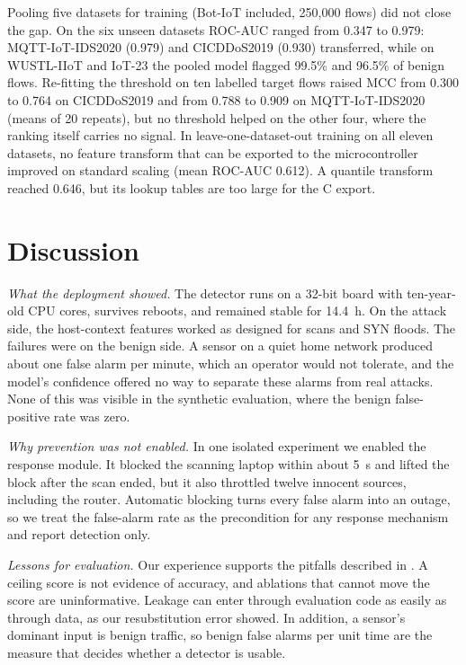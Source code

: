 \documentclass[conference]{IEEEtran}
\begin{document}
Pooling five datasets for training (Bot-IoT included, 250{,}000 flows) did
not close the gap. On the six unseen datasets ROC-AUC ranged from 0.347 to
0.979: MQTT-IoT-IDS2020 (0.979) and CICDDoS2019 (0.930) transferred, while
on WUSTL-IIoT and IoT-23 the pooled model flagged 99.5\% and 96.5\% of
benign flows. Re-fitting the threshold on ten labelled target flows raised
MCC from 0.300 to 0.764 on CICDDoS2019 and from 0.788 to 0.909 on
MQTT-IoT-IDS2020 (means of 20 repeats), but no threshold helped on the
other four, where the ranking itself carries no signal. In leave-one-dataset-out
training on all eleven datasets, no feature transform that can be exported
to the microcontroller improved on standard scaling (mean ROC-AUC 0.612).
A quantile transform reached 0.646, but its lookup tables are too large for
the C export.

\section{Discussion}\label{sec:discussion}

\textit{What the deployment showed.}
The detector runs on a 32-bit board with ten-year-old CPU cores, survives
reboots, and remained stable for 14.4~h. On the attack side, the
host-context features worked as designed for scans and SYN floods. The
failures were on the benign side. A sensor on a quiet home network
produced about one false alarm per minute, which an operator would not
tolerate, and the model's confidence offered no way to separate these
alarms from real attacks. None of this was visible in the synthetic
evaluation, where the benign false-positive rate was zero.

\textit{Why prevention was not enabled.}
In one isolated experiment we enabled the response module. It blocked the
scanning laptop within about 5~s and lifted the block after the scan
ended, but it also throttled twelve innocent sources, including the
router. Automatic blocking turns every false alarm into an outage, so we
treat the false-alarm rate as the precondition for any response mechanism
and report detection only.

\textit{Lessons for evaluation.}
Our experience supports the pitfalls described in
\cite{sommer2010outside,arp2022dos,apruzzese2023sok}. A ceiling score is
not evidence of accuracy, and ablations that cannot move the score are
uninformative. Leakage can enter through evaluation code as easily as
through data, as our resubstitution error showed. In addition, a sensor's
dominant input is benign traffic, so benign false alarms per unit time are
the measure that decides whether a detector is usable.
\end{document}
